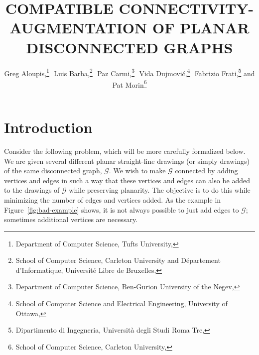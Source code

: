 \documentclass[11pt]{patmorin}
\title{\MakeUppercase{Compatible Connectivity-Augmentation of Planar Disconnected Graphs}}
\author{Greg Aloupis,\thanks{Department of Computer Science, Tufts University, 
                             \email{aloupis.greg@gmail.com}}\,\,
       Luis Barba,\thanks{School of Computer Science, Carleton University
                          and Département d'Informatique, 
                          Université Libre de Bruxelles,
                          \email{lbarbafl@ulb.ac.be}}\,\,
       Paz Carmi,\thanks{Department of Computer Science,
                         Ben-Gurion University of the Negev,
                         \email{carmip@cs.bgu.ac.il}}\,\,
       Vida Dujmović,\thanks{School of Computer Science 
                             and Electrical Engineering,
                             University of Ottawa,
                             \email{vida.dujmovic@uottawa.ca}}\,\,
       Fabrizio Frati,\thanks{Dipartimento di Ingegneria,
                              Università degli Studi Roma Tre,
                              \email{frati@dia.uniroma3.it}}\newline
       and Pat Morin\thanks{School of Computer Science, Carleton University,
                            \email{morin@scs.carleton.ca}}}
\begin{document}
%
%

\pagestyle{fancy}
\setcounter{page}{13}


\section{Introduction}


Consider the following problem, which will be more carefully formalized
below.  We are given several different planar straight-line drawings
(or simply drawings) of the same disconnected graph, $\mathcal G$.
We wish to make $\mathcal G$ connected by adding vertices and edges in
such a way that these vertices and edges can also be added to the 
drawings of $\mathcal G$ while preserving planarity.  
The objective is to do this while minimizing the number
of edges and vertices added.  As the example in Figure~\ref{fig:bad-example} shows, it is not always possible to just add edges to $\mathcal G$; sometimes additional vertices are necessary.
\end{document}
